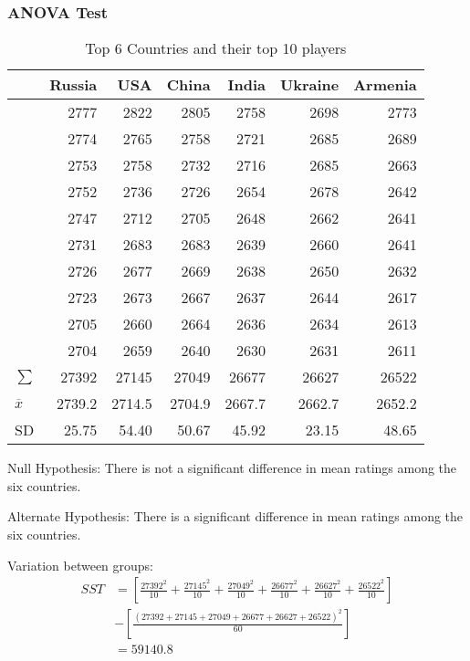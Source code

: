\documentclass[12pt]{article}
\begin{document}
\subsubsection{ANOVA Test}

\begin{table}[H]
\begin{center}
\begin{tabular}{lrrrrrr}
 & Russia & USA & China & India & Ukraine & Armenia\\
\hline
 & 2777 & 2822 & 2805 & 2758 & 2698 & 2773\\
 & 2774 & 2765 & 2758 & 2721 & 2685 & 2689\\
 & 2753 & 2758 & 2732 & 2716 & 2685 & 2663\\
 & 2752 & 2736 & 2726 & 2654 & 2678 & 2642\\
 & 2747 & 2712 & 2705 & 2648 & 2662 & 2641\\
 & 2731 & 2683 & 2683 & 2639 & 2660 & 2641\\
 & 2726 & 2677 & 2669 & 2638 & 2650 & 2632\\
 & 2723 & 2673 & 2667 & 2637 & 2644 & 2617\\
 & 2705 & 2660 & 2664 & 2636 & 2634 & 2613\\
 & 2704 & 2659 & 2640 & 2630 & 2631 & 2611\\
\(\sum\) & 27392 & 27145 & 27049 & 26677 & 26627 & 26522\\
 \(\overline{x}\) & 2739.2 & 2714.5 & 2704.9 & 2667.7 & 2662.7 & 2652.2\\
SD & 25.75 & 54.40 & 50.67 & 45.92 & 23.15 & 48.65\\
\end{tabular}
\caption{Top 6 Countries and their top 10 players}
\end{center}
\end{table}

Null Hypothesis: There is not a significant difference in mean ratings among the six countries. 

Alternate Hypothesis: There is a significant difference in mean ratings among the six countries. 

Variation between groups:
\begin{equation}
\begin{split}
    SST & = [\frac{27392^{2}}{10} + \frac{27145^{2}}{10} + \frac{27049^{2}}{10} + \frac{26677^{2}}{10} + \frac{26627^{2}}{10} + \frac{26522^{2}}{10}] \\ 
    & - [\frac{(27392+27145+27049+26677+26627+26522)^{2}}{60}] \\
    & = 59140.8 
\end{split}
\end{equation}
\end{document}
